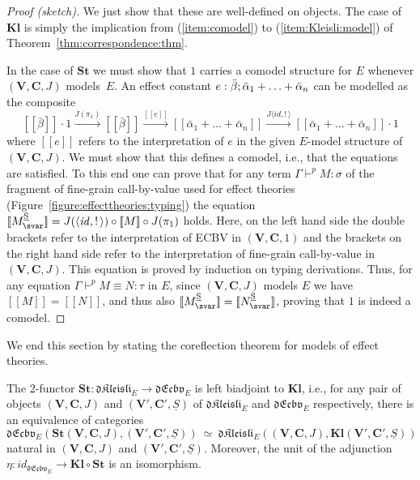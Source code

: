 \documentclass{LMCS}
\newenvironment{proofsketch}{\begin{proof}[Proof (sketch)]}{\end{proof}}
\newcommand{\pj}[3]{#1 \mathrel{\vdash^p} #2 \colon \! #3}
\newcommand{\peq}[4]{#1 \mathrel{\vdash^p} #2\equiv #3 \colon \! #4}
\newcommand{\STA}{\sigma}
\newcommand{\bang}[1]{{!} \,#1}
\newcommand{\co}{\colon}
\newcommand{\ECBV}{ECBV}
\renewcommand{\vec}[1]{\bar{#1}}
\newcommand{\VCat}{\fixedcatfont{V}} \newcommand{\CCat}{\fixedcatfont{C}} \newcommand{\DCat}{\fixedcatfont{D}}
\newcommand{\id}{\mathit{id}}
\newcommand{\ltensor}[2]{#1 \cdot #2}
\newcommand{\fixedcatfont}{\mathbf}
\newcommand{\denlb}{[\![}
\newcommand{\denrb}{]\!]}
\newcommand{\den}[1]{\denlb{#1}\denrb}
\newcommand{\pair}[2]{\langle #1 , #2 \rangle}
\newcommand{\stateobj}{{\underline{S}}}
\newcommand{\dCATECBV}{\TwoCatFont{dEcbv}}
\newcommand{\dFreyd}{\TwoCatFont{dKleisli}}
\newcommand{\CATECBVtheory}[1]{\dCATECBV_{#1}}
\newcommand{\Freydtheory}[1]{\dFreyd_{#1}}
\newcommand{\FreydToECBV}{\mathbf{St}}
\newcommand{\ECBVToFreyd}{\mathbf{Kl}}
\newcommand{\TwoCatFont}[1]{\mathfrak{#1}}
\begin{document}
\begin{proofsketch}
We just show that these are well-defined on objects. The case of $\ECBVToFreyd$ is simply the implication
from (\ref{item:comodel}) to (\ref{item:Kleisli:model}) of Theorem~\ref{thm:correspondence:thm}.

In the case of $\FreydToECBV$ we must show that $1$ carries a comodel structure 
for $E$ whenever $(\VCat, \CCat, J)$ models~$E$. An effect constant 
${\arityj{\geff}{\vec\beta}{\vec \alpha_1 + \ldots + \vec \alpha_n}}$  can be modelled 
as the composite
\[\ltensor{\den{\vec\beta}}{1}
\xrightarrow{J(\pi_1)}
\den{\vec\beta}
\xrightarrow{\den e} 
\den{\vec \alpha_1 + \ldots + \vec \alpha_n} 
\xrightarrow{J\pair{\id}{\bang{}}}
\ltensor{\den{\vec \alpha_1 + \ldots + \vec \alpha_n}}{1}
\]
where $\den{e}$ refers to the interpretation of $e$ in the given
$E$-model structure of $(\VCat, \CCat, J)$.  We must show that this
defines a comodel, i.e., that the equations are satisfied.  To this
end one can prove that for any term $\pj{\Gamma}{M}{\STA}$ of the
fragment of fine-grain call-by-value used for effect theories
(Figure~\ref{figure:effecttheories:typing}) the equation
$\den{\CBVtoEECP{M}} = J(\pair{\id}{\bang{}}) \circ \den M \circ
J(\pi_1)$ holds. Here, on the left hand side the double brackets refer to the
interpretation of {\ECBV} in $(\VCat, \CCat, 1)$ and the brackets on
the right hand side refer to the interpretation of fine-grain
call-by-value in $(\VCat, \CCat, J)$. This equation is proved by
induction on typing derivations. Thus, for any equation $\peq \Gamma M
N \tau$ in $E$, since $(\VCat, \CCat, J)$ models $E$ we have $\den M =
\den N$, and thus also $\den{\CBVtoEECP{M}} = \den{\CBVtoEECP{N}}$,
proving that $1$ is indeed a comodel.
\end{proofsketch}
We end this section by stating the coreflection theorem for models of effect theories.

\begin{thm} \label{thm:adj:eff}
The 2-functor $\FreydToECBV \co \Freydtheory{E} \to \CATECBVtheory{E}$ is left biadjoint to $\ECBVToFreyd$, i.e., 
for any pair of objects $(\VCat, \CCat, J)$  and $(\VCat', \CCat', \stateobj)$ of $\Freydtheory{E}$ and $\CATECBVtheory{E}$ respectively, there is an equivalence of categories
\[\CATECBVtheory{E}(\FreydToECBV(\VCat, \CCat, J),(\VCat', \CCat',
\stateobj)) 
\ \simeq \ 
\Freydtheory{E}((\VCat, \CCat,J),\ECBVToFreyd(\VCat', \CCat', \stateobj))
\]
natural in $(\VCat, \CCat, J)$  and $(\VCat', \CCat', \stateobj)$. 
Moreover, the unit of the adjunction $\eta \co \id_{\CATECBVtheory{E}} \to \ECBVToFreyd\circ\FreydToECBV$ is an isomorphism.
\end{thm}
\end{document}
